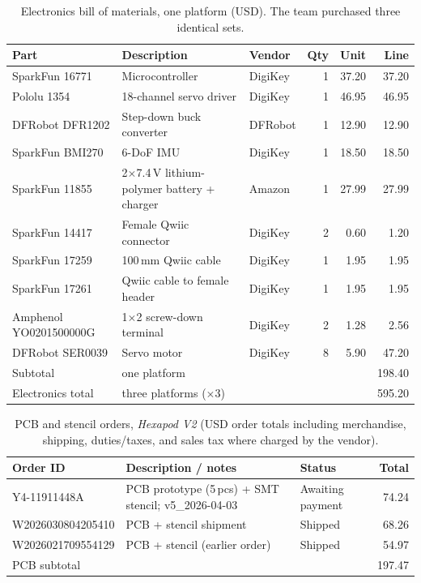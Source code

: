\documentclass[11pt]{article}
\begin{document}
\begin{table}[htbp]
  \centering
  \caption{Electronics bill of materials, one platform (USD). The team purchased three identical sets.}
  \label{tab:cost}
  \footnotesize
  \setlength{\tabcolsep}{4pt}
  \begin{tabular}{@{}p{2.55cm}p{4.05cm}p{1.55cm}rrr@{}}
    \toprule
    Part & Description & Vendor & Qty & Unit & Line \\
    \midrule
    SparkFun 16771 & Microcontroller & DigiKey & 1 & 37.20 & 37.20 \\
    Pololu 1354 & 18-channel servo driver & DigiKey & 1 & 46.95 & 46.95 \\
    DFRobot DFR1202 & Step-down buck converter & DFRobot & 1 & 12.90 & 12.90 \\
    SparkFun BMI270 & 6-DoF IMU & DigiKey & 1 & 18.50 & 18.50 \\
    SparkFun 11855 & 2$\times$7.4\,V lithium-polymer battery + charger & Amazon & 1 & 27.99 & 27.99 \\
    SparkFun 14417 & Female Qwiic connector & DigiKey & 2 & 0.60 & 1.20 \\
    SparkFun 17259 & 100\,mm Qwiic cable & DigiKey & 1 & 1.95 & 1.95 \\
    SparkFun 17261 & Qwiic cable to female header & DigiKey & 1 & 1.95 & 1.95 \\
    Amphenol YO0201500000G & 1$\times$2 screw-down terminal & DigiKey & 2 & 1.28 & 2.56 \\
    DFRobot SER0039 & Servo motor & DigiKey & 8 & 5.90 & 47.20 \\
    \midrule
    Subtotal & one platform & & & & 198.40 \\
    Electronics total & three platforms ($\times$3) & & & & 595.20 \\
    \bottomrule
  \end{tabular}
\end{table}
\normalsize

\begin{table}[htbp]
  \centering
  \caption{PCB and stencil orders, \emph{Hexapod V2} (USD order totals including merchandise, shipping, duties/taxes, and sales tax where charged by the vendor).}
  \label{tab:pcb}
  \footnotesize
  \begin{tabular}{@{}p{3.1cm}p{4.6cm}p{2.0cm}r@{}}
    \toprule
    Order ID & Description / notes & Status & Total \\
    \midrule
    Y4-11911448A & PCB prototype (5\,pcs) + SMT stencil; v5\_2026-04-03 & Awaiting payment & 74.24 \\
    W2026030804205410 & PCB + stencil shipment & Shipped & 68.26 \\
    W2026021709554129 & PCB + stencil (earlier order) & Shipped & 54.97 \\
    \midrule
    PCB subtotal & & & 197.47 \\
    \bottomrule
  \end{tabular}
\end{table}
\normalsize
\end{document}
